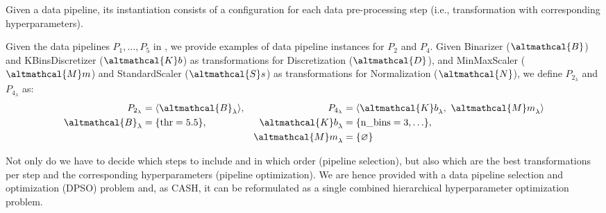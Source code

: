 Given a data pipeline, its instantiation consists of a configuration for each data pre-processing step (i.e., transformation with corresponding hyperparameters).

\begin{example}
    \label{background-ex:ml-pipeline-inst}
    Given the data pipelines $P_1, \dots, P_5$ in , we provide examples of data pipeline instances for $P_2$ and $P_4$.
    Given \textup{Binarizer} ($\altmathcal{B}$) and  \textup{KBinsDiscretizer} ($\altmathcal{K}b$) as transformations for Discretization ($\altmathcal{D}$), and \textup{MinMaxScaler} ($\altmathcal{M}m$) and \textup{StandardScaler} ($\altmathcal{S}s$) as transformations for Normalization ($\altmathcal{N}$), we define $P_{2_{\lambda}}$ and $P_{4_{\lambda}}$ as:
    \begin{align*}
        P_{2_{\lambda}} &= \langle {\altmathcal{B}}_{\lambda}\rangle, & P_{4_{\lambda}} &= \langle {\altmathcal{K}b}_{\lambda},~ {\altmathcal{M}m}_{\lambda} \rangle \\
        {\altmathcal{B}}_{\lambda}&=\{ \textup{thr}=5.5 \}, &{\altmathcal{K}b}_{\lambda}&=\{ \textup{n\_bins}=3, \ldots \},\\
        & & {\altmathcal{M}m}_{\lambda}&=\{ \varnothing \}
    \end{align*}
\end{example}

Not only do we have to decide which steps to include and in which order (pipeline selection), but also which are the best transformations per step and the corresponding hyperparameters (pipeline optimization).
We are hence provided with a data pipeline selection and optimization (DPSO) problem \cite{} and, as CASH, it can be reformulated as a single combined hierarchical hyperparameter optimization problem.

